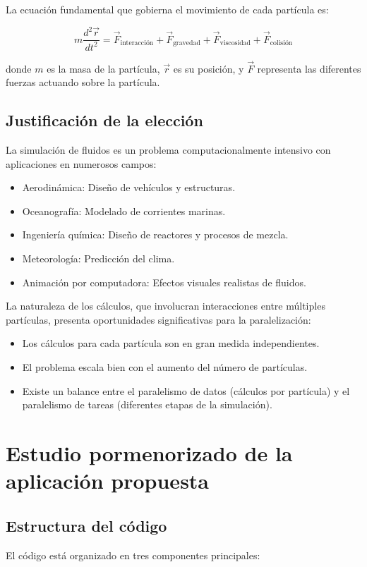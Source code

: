 \documentclass[12pt,a4paper]{article}
\begin{document}
	La ecuación fundamental que gobierna el movimiento de cada partícula es:
	
	\[
	m\frac{d^2\vec{r}}{dt^2} = \vec{F}_\text{interacción} + \vec{F}_\text{gravedad} + \vec{F}_\text{viscosidad} + \vec{F}_\text{colisión}
	\]
	
	donde $m$ es la masa de la partícula, $\vec{r}$ es su posición, y $\vec{F}$ representa las diferentes fuerzas actuando sobre la partícula.
	
	\subsection{Justificación de la elección}
	La simulación de fluidos es un problema computacionalmente intensivo con aplicaciones en numerosos campos:
	\begin{itemize}
		\item Aerodinámica: Diseño de vehículos y estructuras.
		\item Oceanografía: Modelado de corrientes marinas.
		\item Ingeniería química: Diseño de reactores y procesos de mezcla.
		\item Meteorología: Predicción del clima.
		\item Animación por computadora: Efectos visuales realistas de fluidos.
	\end{itemize}
	
	La naturaleza de los cálculos, que involucran interacciones entre múltiples partículas, presenta oportunidades significativas para la paralelización:
	\begin{itemize}
		\item Los cálculos para cada partícula son en gran medida independientes.
		\item El problema escala bien con el aumento del número de partículas.
		\item Existe un balance entre el paralelismo de datos (cálculos por partícula) y el paralelismo de tareas (diferentes etapas de la simulación).
	\end{itemize}
	
	\newpage
	
	\section{Estudio pormenorizado de la aplicación propuesta}
	\subsection{Estructura del código}
	El código está organizado en tres componentes principales:
	
\end{document}
